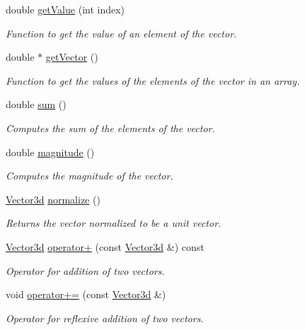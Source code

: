 \begin{DoxyCompactItemize}
double \hyperlink{classVector3d_a37055dde72eed6770cf3b2b11b56f0f8}{get\-Value} (int index)
\begin{DoxyCompactList}\small\item\em Function to get the value of an element of the vector. \end{DoxyCompactList}\item 
double $\ast$ \hyperlink{classVector3d_a12ca89ab46c79eb78fa6b75cad1a3616}{get\-Vector} ()
\begin{DoxyCompactList}\small\item\em Function to get the values of the elements of the vector in an array. \end{DoxyCompactList}\item 
double \hyperlink{classVector3d_a76fa7fc5a86ba77a6764eb0d9072e90a}{sum} ()
\begin{DoxyCompactList}\small\item\em Computes the sum of the elements of the vector. \end{DoxyCompactList}\item 
double \hyperlink{classVector3d_a9fd3cba8bbdf983db6c2a2eae00c4b29}{magnitude} ()
\begin{DoxyCompactList}\small\item\em Computes the magnitude of the vector. \end{DoxyCompactList}\item 
\hyperlink{classVector3d}{Vector3d} \hyperlink{classVector3d_a24acba00068d9d1612404243f2a01078}{normalize} ()
\begin{DoxyCompactList}\small\item\em Returns the vector normalized to be a unit vector. \end{DoxyCompactList}\item 
\hyperlink{classVector3d}{Vector3d} \hyperlink{classVector3d_ad714ad56910f370335c18262dc5cc13a}{operator+} (const \hyperlink{classVector3d}{Vector3d} \&) const 
\begin{DoxyCompactList}\small\item\em Operator for addition of two vectors. \end{DoxyCompactList}\item 
void \hyperlink{classVector3d_a034e9f847d613c9cba1cb47202b8143a}{operator+=} (const \hyperlink{classVector3d}{Vector3d} \&)
\begin{DoxyCompactList}\small\item\em Operator for reflexive addition of two vectors. \end{DoxyCompactList}\item 

\end{DoxyCompactItemize}
